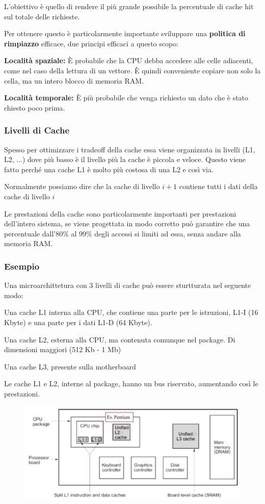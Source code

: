 \spacer
L'obiettivo è quello di rendere il più grande possibile la percentuale di cache hit sul totale delle richieste.

Per ottenere questo è particolarmente importante sviluppare una \textbf{politica di rimpiazzo} efficace, due principi efficaci a questo scopo:

\spacer
\begin{sitemize}
    \item \textbf{Località spaziale:} È probabile che la CPU debba accedere alle celle adiacenti, come nel caso della lettura di un vettore. È quindi conveniente copiare non solo la cella, ma un intero blocco di memoria RAM.
    \item \textbf{Località temporale:} È più probabile che venga richiesto un dato che è stato chiesto poco prima.
\end{sitemize}

\subsubsection*{Livelli di Cache}
Spesso per ottimizzare i tradeoff della cache essa viene organizzata in livelli (L1, L2, ...) dove più basso è il livello più la cache è piccola e veloce.
Questo viene fatto perché una cache L1 è molto più costosa di una L2 e così via.


Normalmente possiamo dire che la cache di livello $i + 1$ contiene tutti i dati della cache di livello $i$

\begin{note}
    Le prestazioni della cache sono particolarmente importanti per prestazioni dell'intero sistema, se viene progettata in modo corretto può garantire che una percentuale dall'80\% al 99\% degli accessi si limiti ad essa, senza andare alla memoria RAM.
\end{note}

\subsubsection{Esempio}
Una microarchittetura con 3 livelli di cache può essere sturtturata nel seguente modo:

\spacer
\begin{sitemize}
    \item Una cache L1 interna alla CPU, che contiene una parte per le istruzioni, L1-I (16 Kbyte) e una parte per i dati L1-D (64 Kbyte).
    \item Una cache L2, esterna alla CPU, ma contenuta comunque nel package. Di dimensioni maggiori (512 Kb - 1 Mb)
    \item Una cache L3, presente sulla motherboard
\end{sitemize}

\spacer
Le cache L1 e L2, interne al package, hanno un bus riservato, aumentando così le prestazioni.

\begin{figure}[H]
    \centering
    \includegraphics[width=0.5\linewidth]{assets/pentium-cache-architecture.png}
\end{figure}

